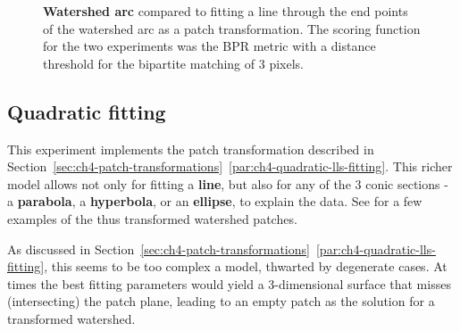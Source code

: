 \begin{figure}[t]
\centering
\caption[{\bf Watershed arc} compared to fitting a line as a patch transformation - plots]{{\bf Watershed arc} compared to fitting a line through the end points of the watershed arc as a patch transformation. The scoring function for the two experiments was the BPR metric with a distance threshold for the bipartite matching of %
3 pixels.}
\label{fig:watershed-arc-experiment}
\end{figure}

\subsection{Quadratic fitting} %
This experiment implements the patch transformation described in Section~\ref*{sec:ch4-patch-transformations}~\ref{par:ch4-quadratic-lls-fitting}. This richer model allows not only for fitting a {\bf line}, but also for any of the 3 conic sections - a {\bf parabola}, a {\bf hyperbola}, or an {\bf ellipse}, to explain the data. See  for a few examples of the thus transformed watershed patches.

As discussed in Section~\ref*{sec:ch4-patch-transformations}~\ref{par:ch4-quadratic-lls-fitting}, this seems to be too complex a model, thwarted by degenerate cases. At times the best fitting parameters would yield a 3-dimensional surface that 
misses (intersecting) the patch plane, 
leading to an empty patch as the solution for a transformed watershed.

